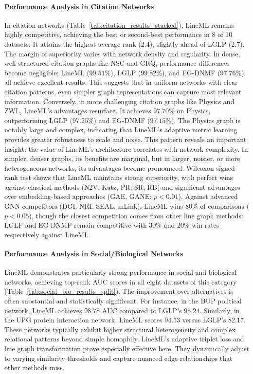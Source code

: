 \documentclass[pdflatex,sn-mathphys-num]{sn-jnl}%
\theoremstyle{thmstyleone}%
\theoremstyle{thmstyletwo}%
\theoremstyle{thmstylethree}%
\theoremstyle{plain} %
\theoremstyle{definition} %
\theoremstyle{remark} %
\theoremstyle{plain} %
\begin{document}
\paragraph{Performance Analysis in Citation Networks} 
In citation networks (Table~\ref{tab:citation_results_stacked}), LineML remains highly competitive, achieving the best or second-best performance in 8 of 10 datasets. 
It attains the highest average rank (2.4), slightly ahead of LGLP (2.7). 
The margin of superiority varies with network density and regularity. 
In dense, well-structured citation graphs like NSC and GRQ, performance differences become negligible; LineML ($99.51\%$), LGLP ($99.82\%$), and EG-DNMF ($97.76\%$) all achieve excellent results. 
This suggests that in uniform networks with clear citation patterns, even simpler graph representations can capture most relevant information.
Conversely, in more challenging citation graphs like Physics and ZWL, LineML's advantages resurface. 
It achieves $97.70\%$ on Physics, outperforming LGLP ($97.25\%$) and EG-DNMF ($97.15\%$). 
The Physics graph is notably large and complex, indicating that LineML's adaptive metric learning provides greater robustness to scale and noise. 
This pattern reveals an important insight: {the value of LineML's architecture correlates with network complexity}. 
In simpler, denser graphs, its benefits are marginal, but in larger, noisier, or more heterogeneous networks, its advantages become pronounced.
Wilcoxon signed-rank test shows that LineML maintains {strong superiority}, with perfect wins against classical methods (N2V, Katz, PR, SR, RB) and significant advantages over embedding-based approaches (GAE, GANE: $p < 0.01$). Against advanced GNN competitors (DGI, NRI, SEAL, mLink), LineML wins 80\% of comparisons ($p < 0.05$), though the closest competition comes from other line graph methods: LGLP and EG-DNMF remain competitive with 30\% and 20\% win rates respectively against LineML.

\paragraph{Performance Analysis in Social/Biological Networks}
LineML demonstrates particularly strong performance in social and biological networks, achieving top-rank AUC scores in all eight datasets of this category (Table~\ref{tab:social_bio_results_split}). 
The improvement over alternatives is often substantial and statistically significant. 
For instance, in the BUP political network, LineML achieves $98.78 $ AUC compared to LGLP's $95.24 $. 
Similarly, in the UPG protein interaction network, LineML scores $94.53$ versus LGLP's $82.17$. 
These networks typically exhibit higher structural heterogeneity and complex relational patterns beyond simple homophily. 
LineML's adaptive triplet loss and line graph transformation prove especially effective here.
They dynamically adjust to varying similarity thresholds and capture nuanced edge relationships that other methods miss.
\end{document}
